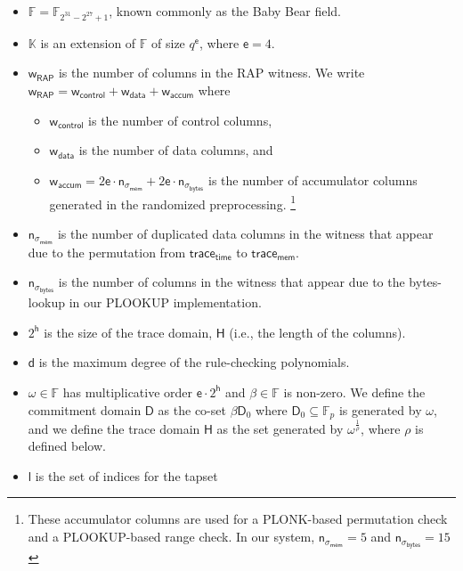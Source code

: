 \documentclass[10pt,letterpaper,titlepage]{article}
\newcommand{\GF}[1]{\mathbb{F}_{#1}}
\newcommand{\w}[0]{\omega}
\theoremstyle{definition}
\begin{document}
\begin{itemize}
  \item $\mathbb{F}=\mathbb{F}_{2^{31} - 2^{27} + 1}$, known commonly as the Baby Bear field. 
  \item $\mathbb{K}$ is an extension of $\mathbb{F}$ of size $q^\mathsf{e}$, where $\mathsf{e}=4$.
  \item $\mathsf{w}_\mathsf{RAP}$ is the number of columns in the RAP witness. 
  We write 
  $\mathsf{w}_\mathsf{RAP} = \mathsf{w}_\mathsf{control} + \mathsf{w}_\mathsf{data} + \mathsf{w}_\mathsf{accum}$ 
  where 
  \begin{itemize}
    \item $\mathsf{w}_\mathsf{control}$ is the number of control columns, 
    \item $\mathsf{w}_\mathsf{data}$ is the number of data columns, and 
    \item $\mathsf{w}_\mathsf{accum}=
    2\mathsf{e}\cdot\mathsf{n}_{\sigma_\mathsf{mem}}+2\mathsf{e}\cdot\mathsf{n}_{\sigma_\mathsf{bytes}}$ 
    is the number of accumulator columns generated in the randomized preprocessing.%
    \footnote{These accumulator columns are used for a PLONK-based permutation check and a PLOOKUP-based range check. 
    In our system, $\mathsf{n}_{\sigma_\mathsf{mem}}=5$ and $\mathsf{n}_{\sigma_\mathsf{bytes}}=15$}
  \end{itemize}
  \item $\mathsf{n}_{\sigma_\mathsf{mem}}$ is the number of duplicated data columns in the witness that appear due to the permutation from $\mathsf{trace_{time}}$ to $\mathsf{trace_{mem}}$. 
  \item $\mathsf{n}_{\sigma_\mathsf{bytes}}$ is the number of columns in the witness that appear due to the bytes-lookup in our PLOOKUP implementation. 
  \item $2^\mathsf{h}$ is the size of the trace domain, $\mathsf{H}$ (i.e., the length of the columns).
  \item $\mathsf{d}$ is the maximum degree of the rule-checking polynomials.
  \item $\w\in\mathbb{F}$ has multiplicative order $\mathsf{e}\cdot2^\mathsf{h}$ and $\beta\in\mathbb{F}$ is non-zero. 
  We define the commitment domain $\mathsf{D}$ as the co-set $\beta \mathsf{D}_0$ where $\mathsf{D}_0\subseteq\GF{p}$ is generated by $\w$, 
  and we define the trace domain $\mathsf{H}$ as the set generated by $\w^\frac{1}{\mathsf{\rho}}$, where $\rho$ is defined below. 
  \item $\mathsf{l}$ is the set of indices for the tapset%

\end{itemize}
\end{document}
